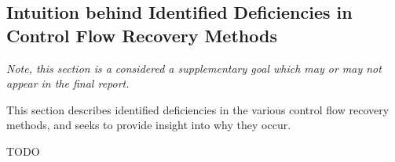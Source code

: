 
\subsection{Intuition behind Identified Deficiencies in Control Flow Recovery Methods}

\textit{Note, this section is a considered a supplementary goal which may or may not appear in the final report.}

This section describes identified deficiencies in the various control flow recovery methods, and seeks to provide insight into why they occur.

TODO
